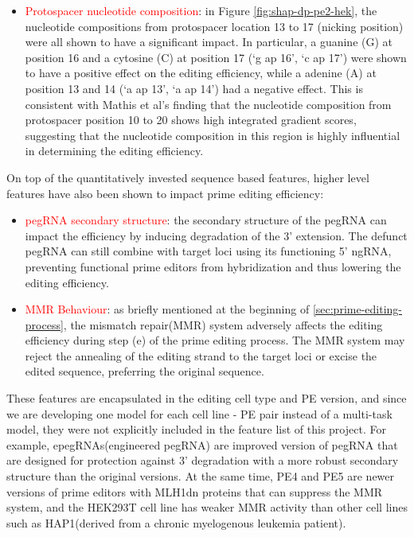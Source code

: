 \begin{itemize}[itemsep=-0mm]
    \item \textcolor{red}{Protospacer nucleotide composition}: in Figure \ref{fig:shap-dp-pe2-hek}, the nucleotide compositions from protospacer location 13 to 17 (nicking position) were all shown to have a significant impact. In particular, a guanine (G) at position 16 and a cytosine (C) at position 17 (`g ap 16', `c ap 17')
     were shown to have a positive effect on the editing efficiency, while a adenine (A) at position 13 and 14 (`a ap 13', `a ap 14') had a negative effect.
    This is consistent with Mathis et al's finding that the nucleotide composition from protospacer position 10 to 20 shows high integrated gradient scores, suggesting that the nucleotide composition in this region is highly influential in determining the editing efficiency\cite{mathisPredictingPrimeEditing2023}.
\end{itemize}

On top of the quantitatively invested sequence based features, higher level features have also been shown to impact prime editing efficiency:
\begin{itemize}[itemsep=-0mm]
    \item \textcolor{red}{pegRNA secondary structure}: the secondary structure of the pegRNA can impact the efficiency by inducing degradation of the 3' extension. The defunct pegRNA can still combine with target loci using its functioning 5' ngRNA, preventing functional prime editors from hybridization and thus lowering the editing efficiency\cite{nelsonEngineeredPegRNAsImprove2022}.
    \item \textcolor{red}{MMR Behaviour}: as briefly mentioned at the beginning of \autoref{sec:prime-editing-process}, the mismatch repair(MMR) system adversely affects the editing efficiency during step (e) of the prime editing process. The MMR system may reject the annealing of the editing strand to the target loci or  excise the edited sequence, preferring the original sequence\cite{chenEnhancedPrimeEditing2021}. 
\end{itemize}

These features are encapsulated in the editing cell type and PE version, and since we are developing one model for each cell line - PE pair instead of a multi-task model, they were not explicitly included in the feature list of this project. For example, epegRNAs(engineered pegRNA) are improved version of pegRNA that are designed for protection against 3' degradation with a more robust secondary structure than the original versions\cite{nelsonEngineeredPegRNAsImprove2022}. At the same time, PE4 and PE5 are newer versions of prime editors with MLH1dn proteins that can suppress the MMR system\cite{chenEnhancedPrimeEditing2021}, and the HEK293T cell line has weaker MMR activity than other cell lines such as HAP1(derived from a chronic myelogenous leukemia patient)\cite{mathisPredictingPrimeEditing2023}. 

